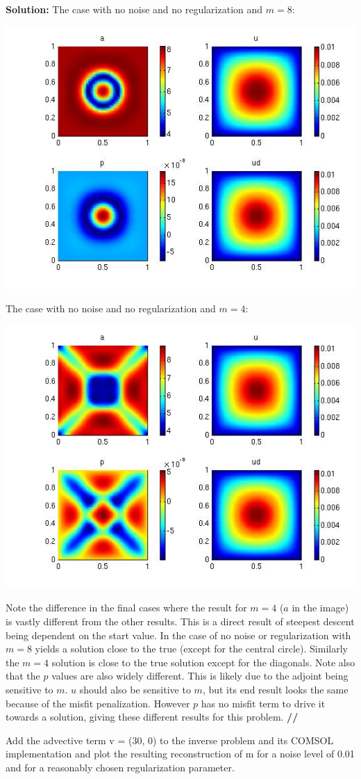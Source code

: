 \documentclass[11pt]{article}
\newenvironment{solution}{\begin{trivlist}\item[]{\bf Solution:}}
                      {\textbf{//} \end{trivlist}}
\begin{document}
\begin{enumerate}
\begin{solution}
The case with no noise and no regularization and $m = 8$:
\begin{center}
\includegraphics[width = 6 cm]{figs/prob2aNoNoiseNoRegM8.jpg}
\end{center}

The case with no noise and no regularization and $m = 4$:
\begin{center}
\includegraphics[width = 6 cm]{figs/prob2aNoNoiseNoRegM4.jpg}
\end{center}

Note the difference in the final cases where the result for $m = 4$ ($a$
 in the image) is vastly different from the other results. This is a
 direct result of steepest descent being dependent on the start
 value. In the case of no noise or regularization with $m = 8$ yields a
 solution close to the true (except for the central circle). Similarly
 the $m = 4$ solution is close to the true solution except for the
 diagonals. Note also that the $p$ values are also widely
 different. This is likely due to the adjoint being sensitive to
 $m$. $u$ should also be sensitive to $m$, but its end result looks the
 same because of the misfit penalization. However $p$ has no misfit term
 to drive it towards a solution, giving these different results for this
 problem. 
\end{solution}

\item[(b)] Add the advective term v = (30, 0) to the inverse problem and its COMSOL
	  implementation and plot the resulting reconstruction of m for
	  a noise level of 0.01 and for a reasonably chosen regularization parameter.



\end{enumerate}
\end{document}
